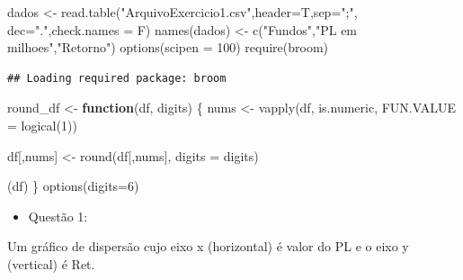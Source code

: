\documentclass[
]{article}
\newenvironment{Shaded}{\begin{snugshade}}{\end{snugshade}}
\newcommand{\AttributeTok}[1]{\textcolor[rgb]{0.77,0.63,0.00}{#1}}
\newcommand{\ControlFlowTok}[1]{\textcolor[rgb]{0.13,0.29,0.53}{\textbf{#1}}}
\newcommand{\DecValTok}[1]{\textcolor[rgb]{0.00,0.00,0.81}{#1}}
\newcommand{\FunctionTok}[1]{\textcolor[rgb]{0.00,0.00,0.00}{#1}}
\newcommand{\NormalTok}[1]{#1}
\newcommand{\OtherTok}[1]{\textcolor[rgb]{0.56,0.35,0.01}{#1}}
\newcommand{\SpecialCharTok}[1]{\textcolor[rgb]{0.00,0.00,0.00}{#1}}
\newcommand{\StringTok}[1]{\textcolor[rgb]{0.31,0.60,0.02}{#1}}
\providecommand{\tightlist}{%
  \setlength{\itemsep}{0pt}\setlength{\parskip}{0pt}}
\begin{document}
\begin{Shaded}
\begin{Highlighting}[]
\NormalTok{dados }\OtherTok{\textless{}{-}} \FunctionTok{read.table}\NormalTok{(}\StringTok{"ArquivoExercicio1.csv"}\NormalTok{,}\AttributeTok{header=}\NormalTok{T,}\AttributeTok{sep=}\StringTok{";"}\NormalTok{, }\AttributeTok{dec=}\StringTok{"."}\NormalTok{,}\AttributeTok{check.names =}\NormalTok{ F)}
\FunctionTok{names}\NormalTok{(dados) }\OtherTok{\textless{}{-}} \FunctionTok{c}\NormalTok{(}\StringTok{"Fundos"}\NormalTok{,}\StringTok{"PL em milhoes"}\NormalTok{,}\StringTok{"Retorno"}\NormalTok{)}
\FunctionTok{options}\NormalTok{(}\AttributeTok{scipen =} \DecValTok{100}\NormalTok{)}
\FunctionTok{require}\NormalTok{(broom)}
\end{Highlighting}
\end{Shaded}

\begin{verbatim}
## Loading required package: broom
\end{verbatim}

\begin{Shaded}
\begin{Highlighting}[]
\NormalTok{round\_df }\OtherTok{\textless{}{-}} \ControlFlowTok{function}\NormalTok{(df, digits) \{}
\NormalTok{  nums }\OtherTok{\textless{}{-}} \FunctionTok{vapply}\NormalTok{(df, is.numeric, }\AttributeTok{FUN.VALUE =} \FunctionTok{logical}\NormalTok{(}\DecValTok{1}\NormalTok{))}

\NormalTok{  df[,nums] }\OtherTok{\textless{}{-}} \FunctionTok{round}\NormalTok{(df[,nums], }\AttributeTok{digits =}\NormalTok{ digits)}

\NormalTok{  (df)}
\NormalTok{\}}
\FunctionTok{options}\NormalTok{(}\AttributeTok{digits=}\DecValTok{6}\NormalTok{)}
\end{Highlighting}
\end{Shaded}

\begin{itemize}
\tightlist
\item
  Questão 1:
\end{itemize}

Um gráfico de dispersão cujo eixo x (horizontal) é valor do PL e o eixo
y (vertical) é Ret.

\begin{Shaded}
\end{Shaded}
\end{document}
